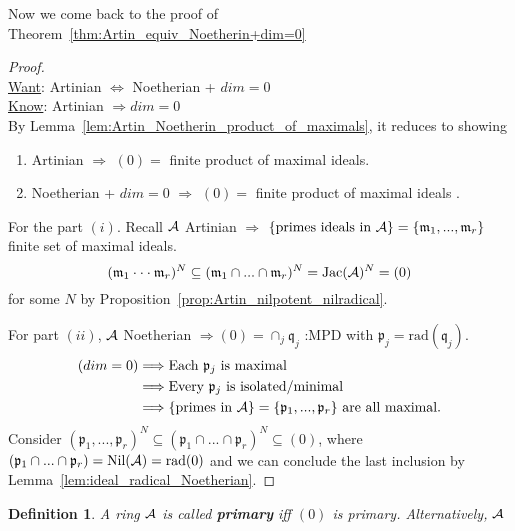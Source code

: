\documentclass[11pt]{article}
\newtheorem{dfn}[thm]{Definition}
\newcommand{\scm}{{\mathfrak m}}
\newcommand{\scp}{{\mathfrak p}}
\newcommand{\scq}{\mathfrak q}
\newcommand{\cala}{{\cal A}}
\newcommand{\Lrta}{\Longrightarrow}
\newcommand{\Llrta}{\Longleftrightarrow}
\begin{document}
Now we come back to the proof of Theorem~\ref{thm:Artin_equiv_Noetherin+dim=0}
\begin{proof}\ \\
\underline{Want}: Artinian   $\Llrta $ Noetherian + $dim=0$\\
\underline{Know}: Artinian   $\Lrta dim=0$\\
By Lemma~\ref{lem:Artin_Noetherin_product_of_maximals}, it reduces to showing 
\begin{enumerate}[label=(\roman*)]
\item Artinian   $\Lrta $ $(0)=$ finite product of maximal ideals.
\item Noetherian + $dim=0$ $\Lrta $ $(0)=$ finite product of maximal ideals .
\end{enumerate}

For the part $(i)$. Recall $\cala$ Artinian   $\Lrta $ $\{\text{primes ideals in } \cala\}=\{\scm_1,...,\scm_r\}$ finite set of maximal ideals.
$$
(\scm_1\cdot \cdot \cdot \scm_r)^N\subseteq (\scm_1\cap ...\cap \scm_r)^N=\text{Jac}(\cala)^N=(0)
$$
for some $N$ by Proposition~\ref{prop:Artin_nilpotent_nilradical}.

For part $(ii)$, $\cala$ Noetherian $\Lrta (0)=\cap_j\scq_j$ :MPD with $\scp_j=\text{rad}(\scq_j)$.
$$
\begin{aligned}
(dim=0)& \Lrta\text{Each $\scp_j$ is maximal}\\
& \Lrta \text{Every $\scp_j$ is isolated/minimal}\\
& \Lrta \text{\{primes in $\cala$\}}=\{\scp_1,...,\scp_r\} \text{ are all maximal.}
\end{aligned}
$$
Consider $(\scp_1,...,\scp_r)^N\subseteq (\scp_1\cap...\cap\scp_r)^N\subseteq (0)$, where $(\scp_1\cap...\cap \scp_r)=\text{Nil}(  \cala)=\text{rad}(0)$ and we can conclude the last inclusion by Lemma~\ref{lem:ideal_radical_Noetherian}.
\end{proof}
\begin{dfn}
A ring $\cala$ is called \textbf{primary} iff $(0)$ is primary. Alternatively, $\cala$
\end{dfn}
\end{document}
